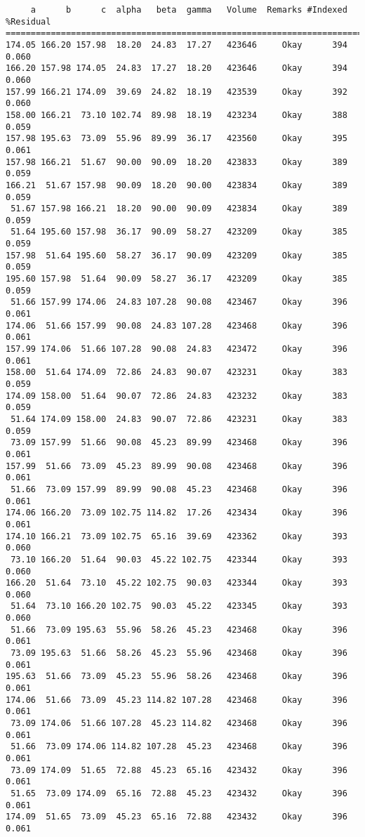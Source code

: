 \documentclass[a4paper, 11pt]{article}
\begin{document}
{\begin{verbatim}
     a      b      c  alpha   beta  gamma   Volume  Remarks #Indexed %Residual
==============================================================================
174.05 166.20 157.98  18.20  24.83  17.27   423646     Okay      394     0.060
166.20 157.98 174.05  24.83  17.27  18.20   423646     Okay      394     0.060
157.99 166.21 174.09  39.69  24.82  18.19   423539     Okay      392     0.060
158.00 166.21  73.10 102.74  89.98  18.19   423234     Okay      388     0.059
157.98 195.63  73.09  55.96  89.99  36.17   423560     Okay      395     0.061
157.98 166.21  51.67  90.00  90.09  18.20   423833     Okay      389     0.059
166.21  51.67 157.98  90.09  18.20  90.00   423834     Okay      389     0.059
 51.67 157.98 166.21  18.20  90.00  90.09   423834     Okay      389     0.059
 51.64 195.60 157.98  36.17  90.09  58.27   423209     Okay      385     0.059
157.98  51.64 195.60  58.27  36.17  90.09   423209     Okay      385     0.059
195.60 157.98  51.64  90.09  58.27  36.17   423209     Okay      385     0.059
 51.66 157.99 174.06  24.83 107.28  90.08   423467     Okay      396     0.061
174.06  51.66 157.99  90.08  24.83 107.28   423468     Okay      396     0.061
157.99 174.06  51.66 107.28  90.08  24.83   423472     Okay      396     0.061
158.00  51.64 174.09  72.86  24.83  90.07   423231     Okay      383     0.059
174.09 158.00  51.64  90.07  72.86  24.83   423232     Okay      383     0.059
 51.64 174.09 158.00  24.83  90.07  72.86   423231     Okay      383     0.059
 73.09 157.99  51.66  90.08  45.23  89.99   423468     Okay      396     0.061
157.99  51.66  73.09  45.23  89.99  90.08   423468     Okay      396     0.061
 51.66  73.09 157.99  89.99  90.08  45.23   423468     Okay      396     0.061
174.06 166.20  73.09 102.75 114.82  17.26   423434     Okay      396     0.061
174.10 166.21  73.09 102.75  65.16  39.69   423362     Okay      393     0.060
 73.10 166.20  51.64  90.03  45.22 102.75   423344     Okay      393     0.060
166.20  51.64  73.10  45.22 102.75  90.03   423344     Okay      393     0.060
 51.64  73.10 166.20 102.75  90.03  45.22   423345     Okay      393     0.060
 51.66  73.09 195.63  55.96  58.26  45.23   423468     Okay      396     0.061
 73.09 195.63  51.66  58.26  45.23  55.96   423468     Okay      396     0.061
195.63  51.66  73.09  45.23  55.96  58.26   423468     Okay      396     0.061
174.06  51.66  73.09  45.23 114.82 107.28   423468     Okay      396     0.061
 73.09 174.06  51.66 107.28  45.23 114.82   423468     Okay      396     0.061
 51.66  73.09 174.06 114.82 107.28  45.23   423468     Okay      396     0.061
 73.09 174.09  51.65  72.88  45.23  65.16   423432     Okay      396     0.061
 51.65  73.09 174.09  65.16  72.88  45.23   423432     Okay      396     0.061
174.09  51.65  73.09  45.23  65.16  72.88   423432     Okay      396     0.061



\end{verbatim}}
\end{document}
